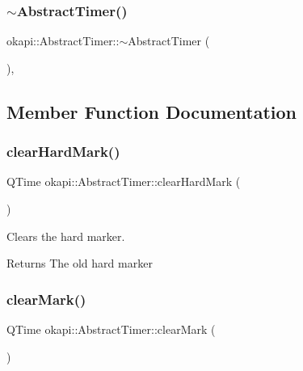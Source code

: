 \subsubsection{\texorpdfstring{$\sim$AbstractTimer()}{~AbstractTimer()}}
{\footnotesize\ttfamily okapi\+::\+Abstract\+Timer\+::$\sim$\+Abstract\+Timer (\begin{DoxyParamCaption}{ }\end{DoxyParamCaption})\hspace{0.3cm}{\ttfamily [virtual]}, {\ttfamily [default]}}



\subsection{Member Function Documentation}
\mbox{\label{classokapi_1_1AbstractTimer_af462e941170d1659dd04ab9d1ead3968}} 
\subsubsection{\texorpdfstring{clearHardMark()}{clearHardMark()}}
{\footnotesize\ttfamily Q\+Time okapi\+::\+Abstract\+Timer\+::clear\+Hard\+Mark (\begin{DoxyParamCaption}{ }\end{DoxyParamCaption})\hspace{0.3cm}{\ttfamily [virtual]}}

Clears the hard marker.

\begin{DoxyReturn}{Returns}
The old hard marker 
\end{DoxyReturn}
\mbox{\label{classokapi_1_1AbstractTimer_a78d62559bbd51a71372f37920af78261}} 
\subsubsection{\texorpdfstring{clearMark()}{clearMark()}}
{\footnotesize\ttfamily Q\+Time okapi\+::\+Abstract\+Timer\+::clear\+Mark (\begin{DoxyParamCaption}{ }\end{DoxyParamCaption})\hspace{0.3cm}{\ttfamily [virtual]}}

